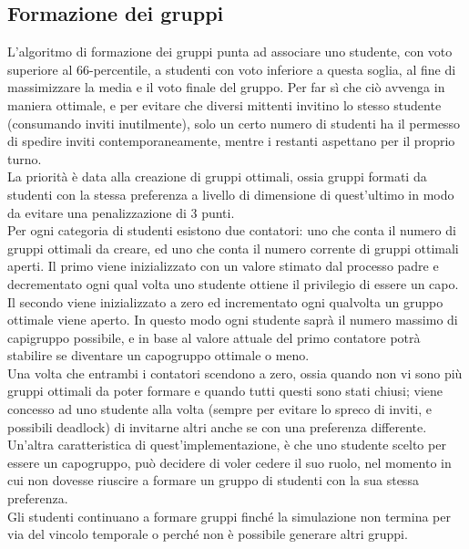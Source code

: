 \documentclass[a4paper,11pt]{article}
\begin{document}
\subsection{Formazione dei gruppi}
L’algoritmo di formazione dei gruppi punta ad associare uno studente, con voto superiore al 66-percentile, a studenti con voto inferiore a questa soglia, al fine di massimizzare la media e il voto finale del gruppo. Per far sì che ciò avvenga in maniera ottimale, e per evitare che diversi mittenti invitino lo stesso studente (consumando inviti inutilmente), solo un certo numero di studenti ha il permesso di spedire inviti contemporaneamente, mentre i restanti aspettano per il proprio turno. \\
La priorità è data alla creazione di gruppi ottimali, ossia gruppi formati da studenti con la stessa preferenza a livello di dimensione di quest’ultimo in modo da evitare una penalizzazione di 3 punti. \\
Per ogni categoria di studenti esistono due contatori: uno che conta il numero di gruppi ottimali da creare, ed uno che conta il numero corrente di gruppi ottimali aperti.
Il primo viene inizializzato con un valore stimato dal processo padre e decrementato ogni qual volta uno studente ottiene il privilegio di essere un capo. Il secondo viene inizializzato a zero ed incrementato ogni qualvolta un gruppo ottimale viene aperto.
In questo modo ogni studente saprà il numero massimo di capigruppo possibile, e in base al valore attuale del primo contatore potrà stabilire se diventare un capogruppo ottimale o meno. \\
Una volta che entrambi i contatori scendono a zero, ossia quando non vi sono più gruppi ottimali da poter formare e quando tutti questi sono stati chiusi; viene concesso ad uno studente alla volta (sempre per evitare lo spreco di inviti, e possibili deadlock) di invitarne altri anche se con una preferenza differente. Un’altra caratteristica di quest’implementazione, è che uno studente scelto per essere un capogruppo, può decidere di voler cedere il suo ruolo, nel momento in cui non dovesse riuscire a formare un gruppo di studenti con la sua stessa preferenza. \\
Gli studenti continuano a formare gruppi finché la simulazione non termina per via del
vincolo temporale o perché non è possibile generare altri gruppi.
\end{document}
